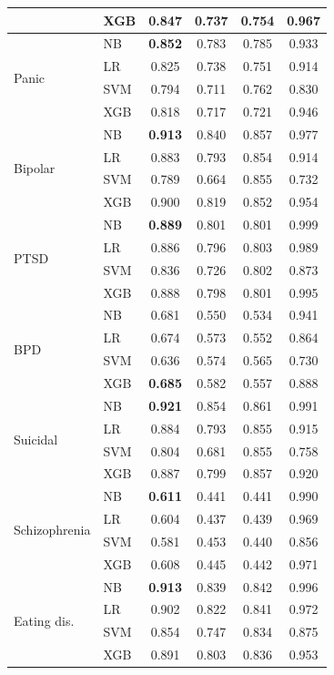 \begin{table}[t]
{\begin{tabular}{llcccc}
 & XGB & 0.847 & 0.737 & 0.754 & 0.967 \\
\midrule
\multirow{4}{*}{Panic}
 & NB & \textbf{0.852} & 0.783 & 0.785 & 0.933 \\
 & LR & 0.825 & 0.738 & 0.751 & 0.914 \\
 & SVM & 0.794 & 0.711 & 0.762 & 0.830 \\
 & XGB & 0.818 & 0.717 & 0.721 & 0.946 \\
\midrule
\multirow{4}{*}{Bipolar}
 & NB & \textbf{0.913} & 0.840 & 0.857 & 0.977 \\
 & LR & 0.883 & 0.793 & 0.854 & 0.914 \\
 & SVM & 0.789 & 0.664 & 0.855 & 0.732 \\
 & XGB & 0.900 & 0.819 & 0.852 & 0.954 \\
\midrule
\multirow{4}{*}{PTSD}
 & NB & \textbf{0.889} & 0.801 & 0.801 & 0.999 \\
 & LR & 0.886 & 0.796 & 0.803 & 0.989 \\
 & SVM & 0.836 & 0.726 & 0.802 & 0.873 \\
 & XGB & 0.888 & 0.798 & 0.801 & 0.995 \\
\midrule
\multirow{4}{*}{BPD}
 & NB & 0.681 & 0.550 & 0.534 & 0.941 \\
 & LR & 0.674 & 0.573 & 0.552 & 0.864 \\
 & SVM & 0.636 & 0.574 & 0.565 & 0.730 \\
 & XGB & \textbf{0.685} & 0.582 & 0.557 & 0.888 \\
\midrule
\multirow{4}{*}{Suicidal}
 & NB & \textbf{0.921} & 0.854 & 0.861 & 0.991 \\
 & LR & 0.884 & 0.793 & 0.855 & 0.915 \\
 & SVM & 0.804 & 0.681 & 0.855 & 0.758 \\
 & XGB & 0.887 & 0.799 & 0.857 & 0.920 \\
\midrule
\multirow{4}{*}{Schizophrenia}
 & NB & \textbf{0.611} & 0.441 & 0.441 & 0.990 \\
 & LR & 0.604 & 0.437 & 0.439 & 0.969 \\
 & SVM & 0.581 & 0.453 & 0.440 & 0.856 \\
 & XGB & 0.608 & 0.445 & 0.442 & 0.971 \\
\midrule
\multirow{4}{*}{Eating dis.}
 & NB & \textbf{0.913} & 0.839 & 0.842 & 0.996 \\
 & LR & 0.902 & 0.822 & 0.841 & 0.972 \\
 & SVM & 0.854 & 0.747 & 0.834 & 0.875 \\
 & XGB & 0.891 & 0.803 & 0.836 & 0.953 \\
\bottomrule
\end{tabular}%
}
\end{table}
